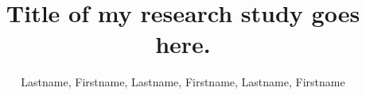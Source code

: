 \documentclass[a4paper,11pt,onecolumn]{article}
\title{\Large\bfseries Title of my research study goes here.}
\author{Lastname, Firstname, Lastname, Firstname, Lastname, Firstname}
\date{}	%
\begin{document}
%	
%	
%	
	\begin{multicols}{2}
%		
%		
			\end{multicols} %
			
			\begin{multicols}{2}
%		
%		
%		
%		
%		
	\end{multicols}
\end{document}
